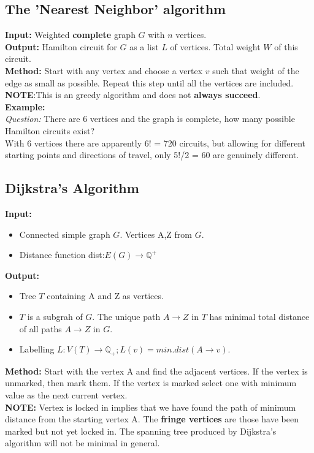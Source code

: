\documentclass{article}
\begin{document}
\begin{spacing}{1.5}
\subsection{The 'Nearest Neighbor' algorithm}
\textbf{Input:} Weighted \textbf{complete} graph $G$ with $n$ vertices.\\
\textbf{Output:} Hamilton circuit for $G$ as a list $L$ of vertices. Total weight $W$ of this circuit. \\
\textbf{Method:} Start with any vertex and choose a vertex $v$ such that weight of the edge as small as possible. Repeat this step until all the vertices are included.\\
\textbf{NOTE}:This is an greedy algorithm and does not \textbf{always succeed}. \\
\textbf{Example:}\\
\textit{Question: }There are 6 vertices and the graph is complete, how many possible Hamilton circuits exist?\\
With 6 vertices there are apparently 6! = 720 circuits, but allowing for different starting points and directions of travel, only 5!/2 = 60 are genuinely different.


\subsection{Dijkstra's Algorithm}
\textbf{Input:} 
\begin{itemize}
    \item Connected simple graph $G$. Vertices A,Z from $G$. 
    \item Distance function dist:$E(G) \rightarrow \mathbb{Q}^+$
\end{itemize}
\textbf{Output:}
\begin{itemize}
    \item Tree $T$ containing A and Z as vertices.
    \item $T$ is a subgrah of $G$. The unique path $A \rightarrow Z$ in $T$ has minimal total distance of all paths $A \rightarrow Z$ in $G$.
    \item Labelling $L:V(T) \rightarrow \mathbb{Q}_+; L(v)=min.dist(A \rightarrow v)$. 
\end{itemize}
\textbf{Method:} Start with the vertex A and find the adjacent vertices. If the vertex is unmarked, then mark them. If the vertex is marked select one with minimum value as the next current vertex.\\
\textbf{NOTE:} Vertex is locked in implies that we have found the path of minimum distance from the starting vertex A. The \textbf{fringe vertices} are those have been marked but not yet locked in. The spanning tree produced by Dijkstra's algorithm will not be minimal in general.


\end{spacing}
\end{document}
